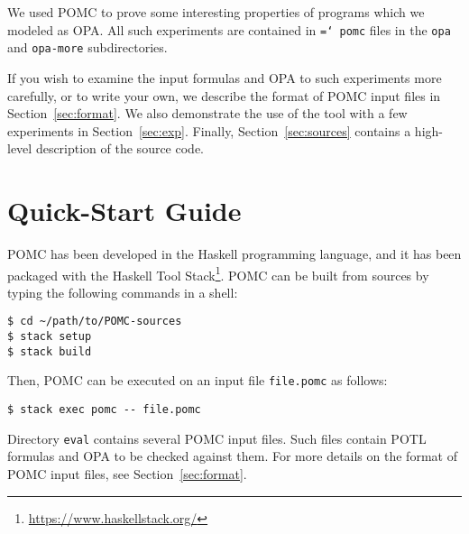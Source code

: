 \documentclass{article}
\begin{document}
We used POMC to prove some interesting properties of programs which we
modeled as OPA.  All such experiments are contained in
\texttt{\hyphenchar\font=`\-
  pomc}
files in the \texttt{opa} and \texttt{opa-more} subdirectories.


If you wish to examine the input formulas and OPA to such experiments more carefully,
or to write your own, we describe the format of POMC input files in Section~\ref{sec:format}.
We also demonstrate the use of the tool with a few experiments in Section~\ref{sec:exp}.
Finally, Section~\ref{sec:sources} contains a high-level description of the source code.


\section{Quick-Start Guide}
\label{sec:quick-start}

POMC has been developed in the Haskell programming language,
and it has been packaged with the Haskell Tool Stack\footnote{\url{https://www.haskellstack.org/}}.
POMC can be built from sources by typing the following commands in a shell:
\begin{verbatim}
$ cd ~/path/to/POMC-sources
$ stack setup
$ stack build
\end{verbatim}
Then, POMC can be executed on an input file \verb|file.pomc| as follows:
\begin{verbatim}
$ stack exec pomc -- file.pomc
\end{verbatim}

Directory \verb|eval| contains several POMC input files. Such files
contain POTL formulas and OPA to be checked against them. For more
details on the format of POMC input files, see
Section~\ref{sec:format}.
\end{document}
